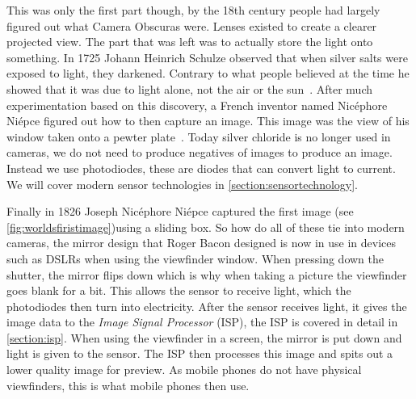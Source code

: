 This was only the first part though, by the 18th century people had largely
figured out what Camera Obscuras were. Lenses existed to create a clearer
projected view. The part that was left was to actually store the light onto
something. In 1725 Johann Heinrich Schulze observed that when silver salts
were exposed to light, they darkened. Contrary to what people believed at the
time he showed that it was due to light alone, not the air or the
sun~\cite{gernsheim1986concise}. After much experimentation based on this
discovery, a French inventor named Nic\'ephore Ni\'epce figured out how to
then capture an image. This image was the view of his window taken onto a
pewter plate~\cite{gernsheim1986concise}. Today silver chloride is no longer
used in cameras, we do not need to produce negatives of images to produce an
image. Instead we use photodiodes, these are diodes that can convert light to
current. We will cover modern sensor technologies in \cref{section:sensortechnology}.

Finally in 1826 Joseph Nic\'ephore Ni\'epce captured the first image (see
\cref{fig:worldsfiristimage})using a sliding box. So how do all of these tie
into modern cameras, the mirror design that Roger Bacon designed is now in use
in devices such as DSLRs when using the viewfinder window. When pressing down
the shutter, the mirror flips down which is why when taking a picture the
viewfinder goes blank for a bit. This allows the sensor to receive light, which
the photodiodes then turn into electricity. After the sensor receives light, it
gives the image data to the \textit{Image Signal Processor} (ISP), the ISP is
covered in detail in \cref{section:isp}. When using the viewfinder in a screen,
the mirror is put down and light is given to the sensor. The ISP then processes
this image and spits out a lower quality image for preview. As mobile phones do
not have physical viewfinders, this is what mobile phones then use.

